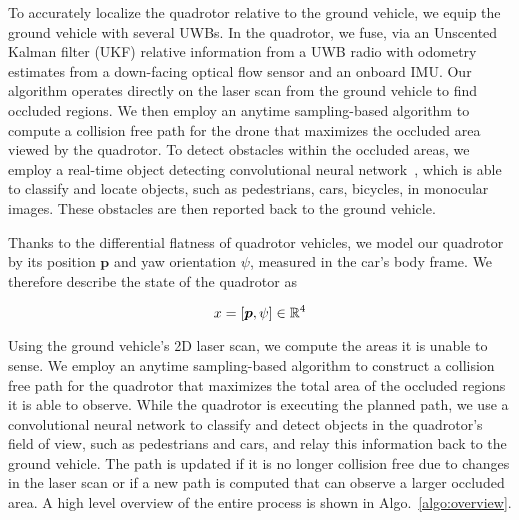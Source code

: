 
To accurately localize the quadrotor relative to the ground vehicle, we equip the ground vehicle with several UWBs. In the quadrotor, we fuse, via an Unscented Kalman filter (UKF) relative information from a UWB radio with odometry estimates from a down-facing optical flow sensor and an onboard IMU.
Our algorithm operates directly on the laser scan from the ground vehicle to find occluded
regions.
We then employ an anytime sampling-based algorithm to compute a collision free path for the drone
that maximizes the occluded area viewed by the quadrotor.
To detect obstacles within the occluded areas, we employ a real-time object
detecting convolutional neural network~\cite{redmond2016you}, which is able to
classify and locate objects, such as pedestrians, cars, bicycles, in monocular
images.  These obstacles are then reported back to the ground vehicle.



Thanks to the differential flatness of quadrotor vehicles, we model our quadrotor by its position $\bm{p}$ and yaw orientation $\psi$, measured in the car's body frame. We therefore describe the state of the quadrotor as

$$
    x = [\bm{p}, \psi] \in \mathbb{R}^4
$$

Using the ground vehicle's 2D laser scan, we compute the areas it is unable to
sense. We employ an anytime sampling-based algorithm to construct a collision free 
path for the quadrotor that maximizes the total area of the occluded
regions it is able to observe. While the quadrotor is executing the planned
path, we use a convolutional neural network to classify and detect objects in
the quadrotor's field of view, such as pedestrians and cars, and relay this
information back to the ground vehicle. The path is updated if it is no longer
collision free due to changes in the laser scan or if a new path is computed
that can observe a larger occluded area. A high level overview of the entire
process is shown in Algo.~\ref{algo:overview}.

